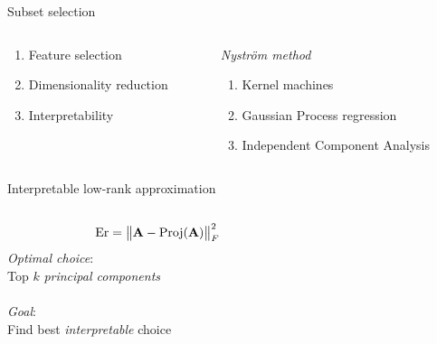 \documentclass{beamer}
\begin{document}
\begin{frame}
\begin{columns}
\begin{column}{0.32\textwidth}
\begin{block}{Subset selection}
\begin{columns}
\begin{column}{.43\textwidth}
{\small
\begin{enumerate}
\item Feature selection
\item Dimensionality reduction
\item Interpretability
\end{enumerate}}
\end{column}
\begin{column}{.53\textwidth}
  \begin{center}
    \emph{Nystr\"om method}\\[1mm]
\end{center}
{\small
\begin{enumerate}
\item Kernel machines
\item Gaussian Process regression
\item Independent Component Analysis
\end{enumerate}}
\end{column}
\end{columns}
\end{block}

 \begin{block}{Interpretable low-rank approximation}
  \begin{columns}
    \begin{column}{0.5\textwidth}
      \begin{align*}
        \mathrm{Er} = \big\|\mathbf A - \mathrm{Proj}(\mathbf A)\big\|_F^2
      \end{align*}
      \emph{Optimal choice}:\\
      {\small Top $k$ \textit{principal components}}\\
      \\[1mm]
      
      \emph{Goal}:\\
      {\small Find best \textit{interpretable} choice}
    \end{column}
    \begin{column}{0.45\textwidth}
      \begin{center}


\end{center}
\end{column}
\end{columns}
\end{block}
\end{column}
\end{columns}
\end{frame}
\end{document}
